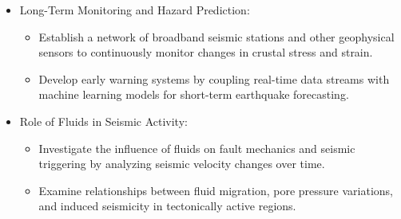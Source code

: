 \begin{itemize}
    \item Long-Term Monitoring and Hazard Prediction:
    \begin{itemize}
        \item Establish a network of broadband seismic stations and other geophysical sensors to continuously monitor changes in crustal stress and strain.
        \item Develop early warning systems by coupling real-time data streams with machine learning models for short-term earthquake forecasting.
    \end{itemize}

    \item Role of Fluids in Seismic Activity:
    \begin{itemize}
        \item Investigate the influence of fluids on fault mechanics and seismic triggering by analyzing seismic velocity changes over time.
        \item Examine relationships between fluid migration, pore pressure variations, and induced seismicity in tectonically active regions.
    \end{itemize}

\end{itemize}



